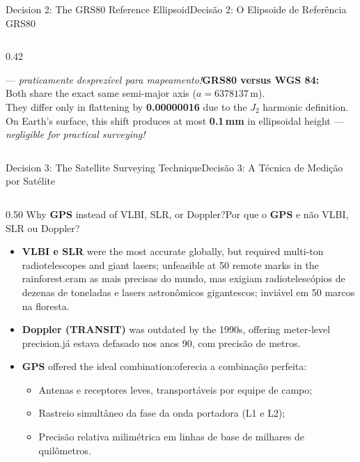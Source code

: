 \documentclass[aspectratio=169,11pt]{beamer}
\newcommand{\tr}[2]{\ifEN#2\else#1\fi}
\newcommand{\bnum}[1]{\ifmmode\textcolor{mTeal}{\mathbf{#1}}\else\textbf{\textcolor{mTeal}{#1}}\fi}
\begin{document}
\begin{frame}{\tr{Decisão 2: O Elipsoide de Referência GRS80}{Decision 2: The GRS80 Reference Ellipsoid}}
\begin{columns}[onlytextwidth]
\begin{column}{0.42\textwidth}
\begin{cuidado}
{        --- \emph{praticamente desprezível para mapeamento!}}{\textbf{GRS80 versus WGS 84:}\\[3pt]
        Both share the exact same semi-major axis ($a = \num{6378137}$\,m).\\[3pt]
        They differ only in flattening by \bnum{\num{0.00000016}} due to the $J_2$ harmonic definition.\\[3pt]
        On Earth's surface, this shift produces at most \bnum{\num{0.1}\,mm} in ellipsoidal height
        --- \emph{negligible for practical surveying!}}
      \end{cuidado}
    \end{column}
  \end{columns}
\end{frame}

\begin{frame}{\tr{Decisão 3: A Técnica de Medição por Satélite}{Decision 3: The Satellite Surveying Technique}}
  \begin{columns}[onlytextwidth]
    \begin{column}{0.50\textwidth}
      \scriptsize
      \tr{Por que o \textbf{GPS} e não VLBI, SLR ou Doppler?}{Why \textbf{GPS} instead of VLBI, SLR, or Doppler?}
      \begin{itemize}
        \setlength{\itemsep}{3pt}
        \item \textbf{VLBI e SLR} \tr{eram as mais precisas do mundo, mas exigiam radiotelescópios de
              dezenas de toneladas e lasers astronômicos gigantescos; inviável em 50 marcos na floresta.}{were
              the most accurate globally, but required multi-ton radiotelescopes and giant lasers;
              unfeasible at 50 remote marks in the rainforest.}
        \item \textbf{Doppler (TRANSIT)} \tr{já estava defasado nos anos 90, com precisão de metros.}{was
              outdated by the 1990s, offering meter-level precision.}
        \item \textbf{GPS} \tr{oferecia a combinação perfeita:}{offered the ideal combination:}
              \begin{itemize}
                \tiny
                \item Antenas e receptores leves, transportáveis por equipe de campo;
                \item Rastreio simultâneo da fase da onda portadora (L1 e L2);
                \item Precisão relativa milimétrica em linhas de base de milhares de quilômetros.

\end{itemize}
\end{itemize}
\end{column}
\end{columns}
\end{frame}
\end{document}
